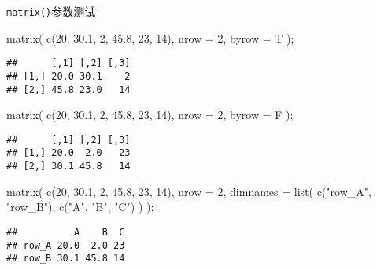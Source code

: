 \documentclass[ignorenonframetext,]{beamer}
\newenvironment{Shaded}{\begin{snugshade}}{\end{snugshade}}
\newcommand{\AttributeTok}[1]{\textcolor[rgb]{0.77,0.63,0.00}{#1}}
\newcommand{\DecValTok}[1]{\textcolor[rgb]{0.00,0.00,0.81}{#1}}
\newcommand{\FloatTok}[1]{\textcolor[rgb]{0.00,0.00,0.81}{#1}}
\newcommand{\FunctionTok}[1]{\textcolor[rgb]{0.00,0.00,0.00}{#1}}
\newcommand{\NormalTok}[1]{#1}
\newcommand{\StringTok}[1]{\textcolor[rgb]{0.31,0.60,0.02}{#1}}
\newcommand\FontSmall{\fontsize{7}{8}\selectfont}
\begin{document}
\begin{frame}[fragile]{\texttt{matrix()}参数测试}
\protect\hypertarget{matrixux53c2ux6570ux6d4bux8bd5}{}
\FontSmall

\begin{Shaded}
\begin{Highlighting}[]
\FunctionTok{matrix}\NormalTok{( }\FunctionTok{c}\NormalTok{(}\DecValTok{20}\NormalTok{, }\FloatTok{30.1}\NormalTok{, }\DecValTok{2}\NormalTok{, }\FloatTok{45.8}\NormalTok{, }\DecValTok{23}\NormalTok{, }\DecValTok{14}\NormalTok{), }\AttributeTok{nrow =} \DecValTok{2}\NormalTok{, }\AttributeTok{byrow =}\NormalTok{ T );}
\end{Highlighting}
\end{Shaded}

\begin{verbatim}
##      [,1] [,2] [,3]
## [1,] 20.0 30.1    2
## [2,] 45.8 23.0   14
\end{verbatim}

\begin{Shaded}
\begin{Highlighting}[]
\FunctionTok{matrix}\NormalTok{( }\FunctionTok{c}\NormalTok{(}\DecValTok{20}\NormalTok{, }\FloatTok{30.1}\NormalTok{, }\DecValTok{2}\NormalTok{, }\FloatTok{45.8}\NormalTok{, }\DecValTok{23}\NormalTok{, }\DecValTok{14}\NormalTok{), }\AttributeTok{nrow =} \DecValTok{2}\NormalTok{, }\AttributeTok{byrow =}\NormalTok{ F );}
\end{Highlighting}
\end{Shaded}

\begin{verbatim}
##      [,1] [,2] [,3]
## [1,] 20.0  2.0   23
## [2,] 30.1 45.8   14
\end{verbatim}

\begin{Shaded}
\begin{Highlighting}[]
\FunctionTok{matrix}\NormalTok{( }\FunctionTok{c}\NormalTok{(}\DecValTok{20}\NormalTok{, }\FloatTok{30.1}\NormalTok{, }\DecValTok{2}\NormalTok{, }\FloatTok{45.8}\NormalTok{, }\DecValTok{23}\NormalTok{, }\DecValTok{14}\NormalTok{), }\AttributeTok{nrow =} \DecValTok{2}\NormalTok{, }
       \AttributeTok{dimnames =} \FunctionTok{list}\NormalTok{( }\FunctionTok{c}\NormalTok{(}\StringTok{"row\_A"}\NormalTok{, }\StringTok{"row\_B"}\NormalTok{), }\FunctionTok{c}\NormalTok{(}\StringTok{"A"}\NormalTok{, }\StringTok{"B"}\NormalTok{, }\StringTok{"C"}\NormalTok{) ) );}
\end{Highlighting}
\end{Shaded}

\begin{verbatim}
##          A    B  C
## row_A 20.0  2.0 23
## row_B 30.1 45.8 14
\end{verbatim}
\end{frame}
\end{document}
